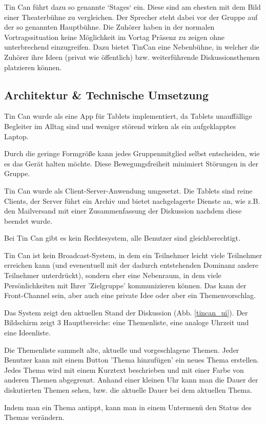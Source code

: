 Tin Can führt dazu so genannte `Stages` ein. Diese sind am ehesten mit dem Bild
einer Theaterbühne zu vergleichen. Der Sprecher steht dabei vor der Gruppe auf
der so genannten Hauptbühne. Die Zuhörer haben in der
normalen Vortragssituation keine Möglichkeit im Vortag Präsenz zu zeigen ohne
unterbrechend einzugreifen. Dazu bietet TinCan eine Nebenbühne, in welcher die
Zuhörer ihre Ideen (privat wie öffentlich) bzw. weiterführende Diskussionsthemen
platzieren können.
 
\subsection{Architektur \& Technische Umsetzung}
Tin Can wurde als eine App für Tablets implementiert, da Tablets unauffällige
Begleiter im Alltag sind und weniger störend wirken als ein aufgeklapptes
Laptop.

Durch die geringe Formgröße kann jedes Gruppenmitglied selbst entscheiden, wie es
das Gerät halten möchte. Diese Bewegungsfreiheit minimiert Störungen in der
Gruppe.

Tin Can wurde als Client-Server-Anwendung umgesetzt. Die Tablets sind reine
Clients, der Server führt ein Archiv und bietet nachgelagerte Dienste an, wie
z.B. den Mailversand mit einer Zusammenfassung der Diskussion nachdem diese
beendet wurde.

Bei Tin Can gibt es kein Rechtesystem, alle Benutzer sind gleichberechtigt.

Tin Can ist kein Broadcast-System, in dem ein Teilnehmer leicht viele Teilnehmer
erreichen kann (und evenentuell mit der dadurch entstehenden Dominanz andere
Teilnehmer unterdrückt), sondern eher eine Nebenraum, in dem viele
Persönlichkeiten mit Ihrer 'Zielgruppe' kommunizieren können. Das kann der
Front-Channel sein, aber auch eine private Idee oder aber ein Themenvorschlag.

Das System zeigt den aktuellen Stand der Diskussion (Abb. \ref{tincan_ui}). Der Bildschirm zeigt 3
Hauptbereiche: eine Themenliste, eine analoge Uhrzeit und eine Ideenliste.

Die Themenliste sammelt alte, aktuelle und vorgeschlagene Themen. Jeder
Benutzer kann mit einem Button 'Thema hinzufügen' ein neues Thema 
erstellen. Jedes Thema wird mit einem Kurztext beschrieben und mit einer Farbe 
von anderen Themen abgegrenzt. Anhand einer kleinen Uhr kann man die Dauer der 
diskutierten Themen sehen, bzw. die aktuelle Dauer bei dem aktuellen Thema.

Indem man ein Thema antippt, kann man in einem Untermenü den Status des Themas
verändern.

